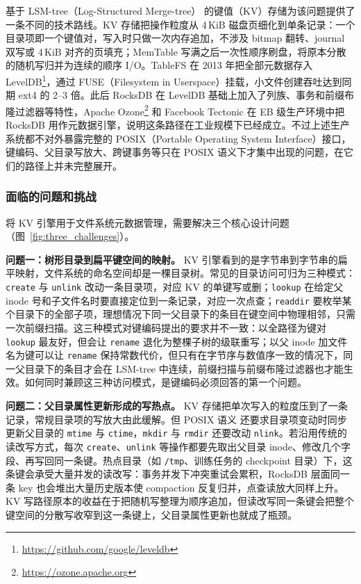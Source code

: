 基于 LSM-tree（Log-Structured Merge-tree）\cite{oneil1996lsmtree} 的键值（KV）存储为该问题提供了一条不同的技术路线。KV 存储把操作粒度从 4\,KiB 磁盘页细化到单条记录：一个目录项即一个键值对，写入时只做一次内存追加，不涉及 bitmap 翻转、journal 双写或 4\,KiB 对齐的页填充；MemTable 写满之后一次性顺序刷盘，将原本分散的随机写归并为连续的顺序 I/O。TableFS\cite{ren2013tablefs} 在 2013 年把全部元数据存入 LevelDB\footnote{\url{https://github.com/google/leveldb}}，通过 FUSE（Filesystem in Userspace）挂载，小文件创建吞吐达到同期 ext4 的 2--3 倍。此后 RocksDB\cite{dong2021rocksdb} 在 LevelDB 基础上加入了列族、事务和前缀布隆过滤器等特性，Apache Ozone\footnote{\url{https://ozone.apache.org}} 和 Facebook Tectonic\cite{pan2021tectonic} 在 EB 级生产环境中把 RocksDB 用作元数据引擎，说明这条路径在工业规模下已经成立。不过上述生产系统都不对外暴露完整的 POSIX（Portable Operating System Interface）接口，键编码、父目录写放大、跨键事务等只在 POSIX 语义下才集中出现的问题，在它们的路径上并未完整展开。

\subsubsection{面临的问题和挑战}

将 KV 引擎用于文件系统元数据管理，需要解决三个核心设计问题（图~\ref{fig:three_challenges}）。

\textbf{问题一：树形目录到扁平键空间的映射。}
KV 引擎看到的是字节串到字节串的扁平映射，文件系统的命名空间却是一棵目录树。常见的目录访问可归为三种模式：\texttt{create} 与 \texttt{unlink} 改动一条目录项，对应 KV 的单键写或删；\texttt{lookup} 在给定父 inode 号和子文件名时要直接定位到一条记录，对应一次点查；\texttt{readdir} 要枚举某个目录下的全部子项，理想情况下同一父目录下的条目在键空间中物理相邻，只需一次前缀扫描。这三种模式对键编码提出的要求并不一致：以全路径为键对 \texttt{lookup} 最友好，但会让 \texttt{rename} 退化为整棵子树的级联重写；以父 inode 加文件名为键可以让 \texttt{rename} 保持常数代价，但只有在字节序与数值序一致的情况下，同一父目录下的条目才会在 LSM-tree 中连续，前缀扫描与前缀布隆过滤器也才能生效。如何同时兼顾这三种访问模式，是键编码必须回答的第一个问题。

\textbf{问题二：父目录属性更新形成的写热点。}
KV 存储把单次写入的粒度压到了一条记录，常规目录项的写放大由此缓解。但 POSIX 语义\cite{ieee2017posix} 还要求目录项变动时同步更新父目录的 \texttt{mtime} 与 \texttt{ctime}，\texttt{mkdir} 与 \texttt{rmdir} 还要改动 \texttt{nlink}。若沿用传统的读改写方式，每次 \texttt{create}、\texttt{unlink} 等操作都要先取出父目录 inode、修改几个字段、再写回同一条键。热点目录（如 \texttt{/tmp}、训练任务的 checkpoint 目录）下，这条键会承受大量并发的读改写：事务并发下冲突重试会累积，RocksDB 层面同一条 key 也会堆出大量历史版本使 compaction 反复归并，点查读放大同样上升。KV 写路径原本的收益在于把随机写整理为顺序追加，但读改写同一条键会把整个键空间的分散写收窄到这一条键上，父目录属性更新也就成了瓶颈。

